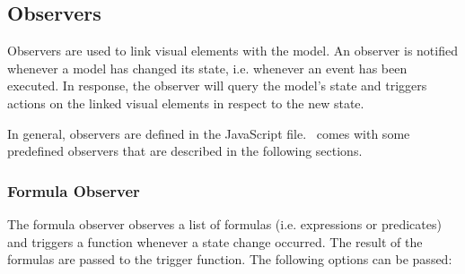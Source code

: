 %
%

\subsection{Observers}

Observers are used to link visual elements with the model. 
An observer is notified whenever a model has changed its state, i.e. whenever an event has been executed. 
In response, the observer will query the model's state and triggers actions on the linked visual elements in respect to the new state. 

In general, observers are defined in the JavaScript file. 
\bms~comes with some predefined observers that are described in the following sections.

\subsubsection{Formula Observer}

The formula observer observes a list of formulas (i.e. expressions or predicates) and triggers a function whenever a state change occurred.
The result of the formulas are passed to the trigger function.
The following options can be passed:

